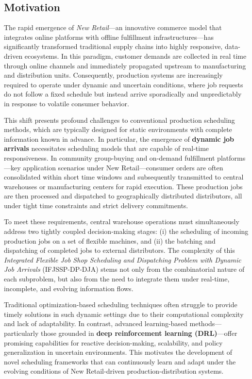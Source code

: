 \documentclass{article}
\begin{document}
\subsection{Motivation}
The rapid emergence of \textit{New Retail}—an innovative commerce model that integrates online platforms with offline fulfillment infrastructures—has significantly transformed traditional supply chains into highly responsive, data-driven ecosystems. In this paradigm, customer demands are collected in real time through online channels and immediately propagated upstream to manufacturing and distribution units. Consequently, production systems are increasingly required to operate under dynamic and uncertain conditions, where job requests do not follow a fixed schedule but instead arrive sporadically and unpredictably in response to volatile consumer behavior.

This shift presents profound challenges to conventional production scheduling methods, which are typically designed for static environments with complete information known in advance. In particular, the emergence of \textbf{dynamic job arrivals} necessitates scheduling models that are capable of real-time responsiveness. In community group-buying and on-demand fulfillment platforms—key application scenarios under New Retail—consumer orders are often consolidated within short time windows and subsequently transmitted to central warehouses or manufacturing centers for rapid execution. These production jobs are then processed and dispatched to geographically distributed distributors, all under tight time constraints and strict delivery commitments.

To meet these requirements, central warehouse operations must simultaneously address two tightly coupled decision-making stages: (i) the scheduling of incoming production jobs on a set of flexible machines, and (ii) the batching and dispatching of completed jobs to external distributors. The complexity of this \textit{Integrated Flexible Job Shop Scheduling and Dispatching Problem with Dynamic Job Arrivals} (IFJSSP-DP-DJA) stems not only from the combinatorial nature of each subproblem, but also from the need to integrate them under real-time, incomplete, and evolving information flows.

Traditional optimization-based scheduling techniques often struggle to provide timely solutions in such dynamic settings due to their computational complexity and lack of adaptability. In contrast, advanced learning-based methods—particularly those grounded in \textbf{deep reinforcement learning (DRL)}—offer promising capabilities for reactive decision-making, scalability, and policy generalization in uncertain environments. This motivates the development of novel scheduling frameworks that can continuously learn and adapt under the evolving conditions of New Retail-driven production-distribution systems.
\end{document}
